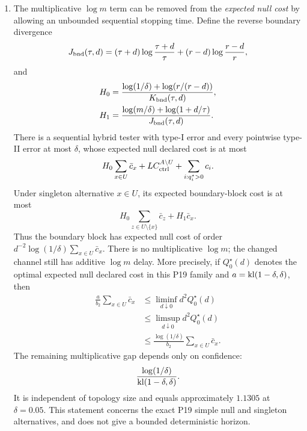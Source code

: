 \begin{theorem}
\begin{enumerate}[label=(\roman*)]
\item The multiplicative \(\log m\) term can be removed from the
\emph{expected null cost} by allowing an unbounded sequential stopping time.
Define the reverse boundary divergence
\begin{equation}\label{eq:formal-results-060}
J_{\rm bnd}(\tau,d)
=
(\tau+d)\log\frac{\tau+d}{\tau}
+(r-d)\log\frac{r-d}{r},
\end{equation}
and
\begin{equation}\label{eq:formal-results-061}
\begin{aligned}
H_0&=\frac{\log(1/\delta)+\log(r/(r-d))}{K_{\rm bnd}(\tau,d)},\\
H_1&=\frac{\log(m/\delta)+\log(1+d/\tau)}{J_{\rm bnd}(\tau,d)}.
\end{aligned}
\end{equation}
There is a sequential hybrid tester with type-I error and every pointwise
type-II error at most \(\delta\), whose expected null declared cost is at most
\begin{equation}\label{eq:formal-results-062}
H_0\sum_{x\in U}\bar c_x
+L C_{\rm ctrl}^{A\setminus U}
+\sum_{i:q_i^\star>0}c_i.
\end{equation}
Under singleton alternative \(x\in U\), its expected boundary-block cost is
at most
\begin{equation}\label{eq:formal-results-063}
H_0\sum_{z\in U\setminus\{x\}}\bar c_z+H_1\bar c_x.
\end{equation}
Thus the boundary block has expected null cost of order
\(d^{-2}\log(1/\delta)\sum_{x\in U}\bar c_x\).
There is no multiplicative \(\log m\); the changed channel still has additive
\(\log m\) delay.  More precisely, if \(Q_0^\star(d)\) denotes the optimal
expected null declared cost in this P19 family and
\(a=\mathrm{kl}(1-\delta,\delta)\), then
\begin{equation}\label{eq:formal-results-064}
\begin{aligned}
\frac{a}{b_2}\sum_{x\in U}\bar c_x
&\le\liminf_{d\downarrow0}d^2Q_0^\star(d)\\
&\le\limsup_{d\downarrow0}d^2Q_0^\star(d)\\
&\le\frac{\log(1/\delta)}{b_2}\sum_{x\in U}\bar c_x.
\end{aligned}
\end{equation}
The remaining multiplicative gap depends only on confidence:
\begin{equation}\label{eq:formal-results-065}
\frac{\log(1/\delta)}{\mathrm{kl}(1-\delta,\delta)}.
\end{equation}
It is independent of topology size and equals approximately
\(1.1305\) at \(\delta=0.05\).  This statement concerns
the exact P19 simple null and singleton alternatives, and does not give a
bounded deterministic horizon.


\end{enumerate}
\end{theorem}
